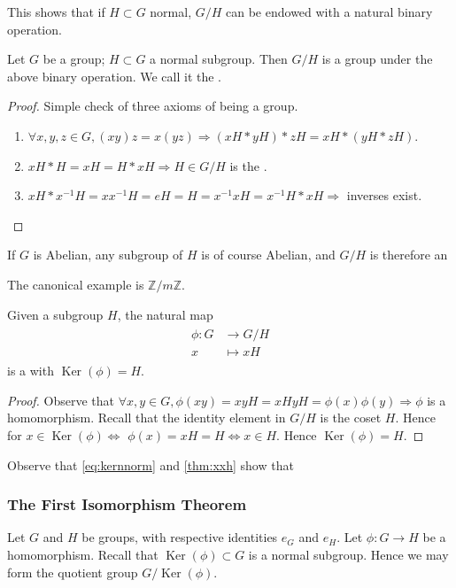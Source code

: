 \documentclass{article}
\begin{document}
This shows that if $H \subset G$ normal, $G / H$ can be endowed with a natural binary operation.
\begin{cora}
Let $G$ be a group; $H \subset G$ a normal subgroup. Then $G / H$ is a group under the above binary operation. We call it the .
\end{cora}
\begin{proof}
Simple check of three axioms of being a group.
\begin{enumerate}
    \item $\forall x, y, z \in G,(x y) z=x(y z) \Rightarrow(x H * y H) * z H = x H *(y H * z H)$.
    \item $x H * H=x H=H * x H \Rightarrow H \in G / H$ is the .
    \item  $x H * x^{-1} H=x x^{-1} H=e H=H=x^{-1} x H=x^{-1} H * x H \Rightarrow$ inverses exist.
\end{enumerate}
\end{proof}
\begin{cora}
If $G$ is Abelian, any subgroup of $H$ is of course Abelian, and $G/H$ is therefore an 
\end{cora}
\begin{rema}
The canonical example is $\mathbb{Z}/m\mathbb{Z}$.
\end{rema}
\begin{thma}\label{thm:xxh}
Given a  subgroup $H$, the natural map
\begin{align*}
\begin{aligned}
\phi: G & \rightarrow G / H \\
x & \mapsto x H
\end{aligned}
\end{align*}
is a  with $\operatorname{Ker}(\phi)=H$.
\end{thma} 
\begin{proof}
Observe that $\forall x, y \in G, \phi(x y)=x y H=x H y H=\phi(x) \phi(y) \Rightarrow \phi$ is a homomorphism. Recall that the identity element in $G / H$ is the coset $H$. Hence for $x \in \operatorname{Ker}(\phi) \Longleftrightarrow$ $\phi(x)=x H=H \Longleftrightarrow x \in H .$ Hence $\operatorname{Ker}(\phi)=H .$
\end{proof} 
Observe that \cref{eq:kernnorm} and \cref{thm:xxh} show that \\
\centerline{}
\subsubsection{The First Isomorphism Theorem}\label{sec:dasfafdf}
Let $G$ and $H$ be groups, with respective identities $e_{G}$ and $e_{H} .$ Let $\phi: G \rightarrow H$ be a homomorphism. Recall that $\operatorname{Ker}(\phi) \subset G$ is a normal subgroup. Hence we may form the quotient group $G / \operatorname{Ker}(\phi)$. 
\end{document}
